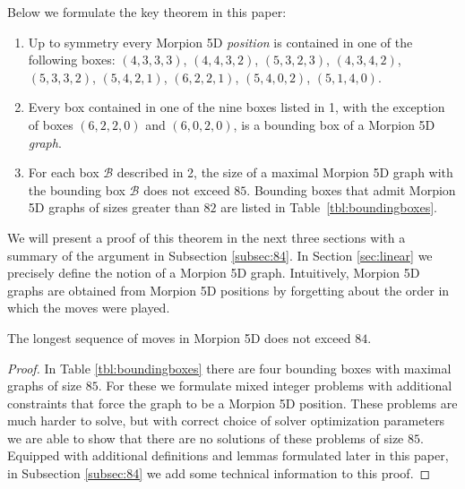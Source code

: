 Below we formulate the key theorem in this paper: %
\begin{theorem}
\begin{enumerate}
\item Up to symmetry every Morpion 5D {\em position} is contained in one of the following boxes:
$(4, 3, 3, 3)$, $(4, 4, 3, 2)$, $(5, 3, 2, 3)$, $(4, 3, 4, 2)$, $(5, 3, 3, 2)$, $(5, 4, 2, 1)$, 
$(6, 2, 2, 1)$, $(5, 4, 0, 2)$, $(5, 1, 4, 0)$. \label{thm:boxes:list}
\item Every box contained in one of the nine boxes listed in 1, with the exception of boxes $(6, 2, 2, 0)$ 
  and $(6, 0, 2, 0)$, is a bounding box of a Morpion 5D {\em graph}.
\item For each box $\mathcal{B}$ described in 2, the size of a maximal Morpion 5D graph with the bounding box $\mathcal{B}$ does not exceed $85$.
  Bounding boxes that admit Morpion 5D graphs of sizes greater than $82$ are listed 
    in Table~\ref{tbl:boundingboxes}. 
\end{enumerate} 
\label{thm:boxes}
\end{theorem}
We will present a proof of this theorem in the next three sections with a summary of the argument in Subsection \ref{subsec:84}. 
In Section \ref{sec:linear} we precisely define the notion of a Morpion 5D graph. Intuitively, Morpion 5D graphs are obtained from Morpion 5D positions by forgetting about the order in which the moves were played.





\begin{corollary}
\label{cor:84}
The longest sequence of moves in Morpion 5D does not exceed $84$.
\end{corollary}
\begin{proof} 
In Table \ref{tbl:boundingboxes} there are four bounding boxes with maximal graphs of size $85$. 
For these we formulate mixed integer problems with additional constraints that force the graph to
  be a Morpion 5D position.
These problems are much harder to solve, but with correct choice of solver optimization parameters we are able to show
  that there are no solutions of these problems of size $85$. Equipped with additional definitions and lemmas formulated later in this paper, in Subsection \ref{subsec:84} we add some technical 
information to this proof. 
\end{proof}
